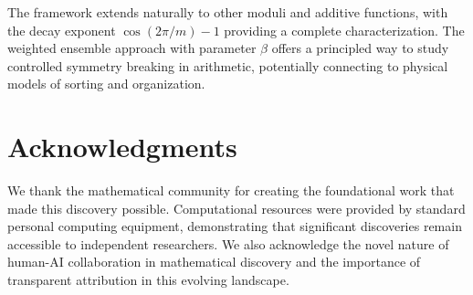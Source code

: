 \documentclass[12pt]{article}
\theoremstyle{definition}
\theoremstyle{remark}
\begin{document}
The framework extends naturally to other moduli and additive functions, with the decay exponent $\cos(2\pi/m) - 1$ providing a complete characterization. The weighted ensemble approach with parameter $\beta$ offers a principled way to study controlled symmetry breaking in arithmetic, potentially connecting to physical models of sorting and organization.

\section*{Acknowledgments}

We thank the mathematical community for creating the foundational work that made this discovery possible. Computational resources were provided by standard personal computing equipment, demonstrating that significant discoveries remain accessible to independent researchers. We also acknowledge the novel nature of human-AI collaboration in mathematical discovery and the importance of transparent attribution in this evolving landscape.



\end{document}
